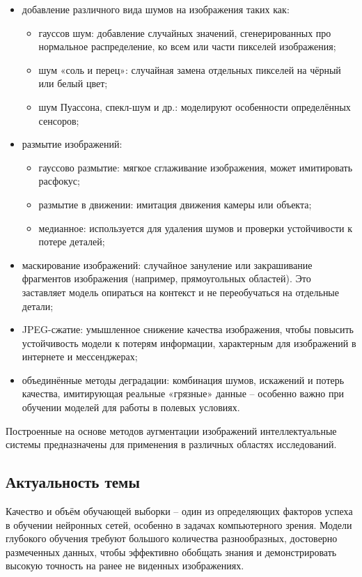 \begin{itemize}
	\item добавление различного вида шумов на изображения таких как:
	\begin{itemize}
	\item гауссов шум: добавление случайных значений, сгенерированных про нормальное распределение, ко всем или части пикселей изображения;
	\item шум «соль и перец»: случайная замена отдельных пикселей на чёрный или белый цвет;
	\item шум Пуассона, спекл-шум и др.: моделируют особенности определённых сенсоров;
	\end{itemize}
	\item размытие изображений:
	\begin{itemize}
	\item гауссово размытие: мягкое сглаживание изображения, может имитировать расфокус;
	\item размытие в движении: имитация движения камеры или объекта;
	\item медианное: используется для удаления шумов и проверки устойчивости к потере деталей;
	\end{itemize}
	\item маскирование изображений: случайное зануление или закрашивание фрагментов изображения (например, прямоугольных областей). Это заставляет модель опираться на контекст и не переобучаться на отдельные детали;
	\item JPEG-сжатие: умышленное снижение качества изображения, чтобы повысить устойчивость модели к потерям информации, характерным для изображений в интернете и мессенджерах;
	\item объединённые методы деградации: комбинация шумов, искажений и потерь качества, имитирующая реальные «грязные» данные – особенно важно при обучении моделей для работы в полевых условиях.
\end{itemize}

Построенные на основе методов аугментации изображений интеллектуальные системы предназначены для применения в различных областях исследований.

\subsection{Актуальность темы}

Качество и объём обучающей выборки – один из определяющих факторов успеха в обучении нейронных сетей, особенно в задачах компьютерного зрения. Модели глубокого обучения требуют большого количества разнообразных, достоверно размеченных данных, чтобы эффективно обобщать знания и демонстрировать высокую точность на ранее не виденных изображениях.


